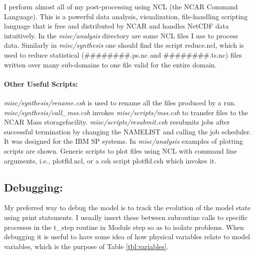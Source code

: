 \documentclass[11pt,a4paper]{article}
\begin{document}
I perform almost all of my post-processing using NCL (the NCAR Command
Language). This is a powerful data analysis, visualization,
file-handling scripting language that is free and distributed by NCAR
and handles NetCDF data intuitively.  In the \emph{misc/analysis}
directory are some NCL files I use to process data.  Similarly in
\emph{misc/synthesis} one should find the script reduce.ncl, which is
used to reduce statistical (\#\#\#\#\#\#\#\#.ps.nc and \#\#\#\#\#\#\#\#.ts.nc)
files written over many sub-domains to one file valid for the entire domain.

\paragraph{Other Useful Scripts:} \emph{misc/synthesis/rename.csh} 
is used to rename all the files produced by a run. 
\emph{misc/synthesis/call\_mss.csh} invokes \emph{misc/scripts/mss.csh} 
to transfer files to the NCAR Mass storagefacility.  
\emph{misc/scripts/resubmit.csh} resubmits jobs after
successful termination by changing the NAMELIST and calling the job
scheduler. It was designed for the IBM SP systems. In
\emph{misc/analysis} examples of plotting scripts are shown.
Generic scripts to plot files using NCL with command line arguments, i.e.,
plotfld.ncl, or a csh script plotfld.csh which invokes it.

\subsection{Debugging:}

My preferred way to debug the model is to track the evolution of the
model state using print statements.  I usually insert these between
subroutine calls to specific processes in the t\_step routine in
Module step so as to isolate problems.  When debugging it is useful to
have some idea of how physical variables relate to model variables,
which is the purpose of Table \ref{tbl:variables}.
\end{document}
